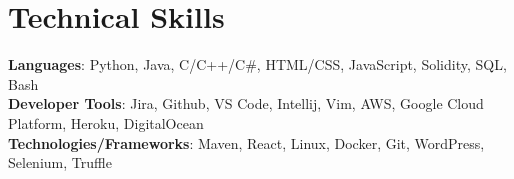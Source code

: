 \documentclass[letterpaper,11pt]{article}
\makeatletter
\newcommand{\resumeItem}[1]{
  \item\small{
    {#1 \vspace{-2pt}}
  }
}
\newcommand{\resumeSubheading}[4]{
  \vspace{-2pt}\item
    \begin{tabular*}{1.0\textwidth}[t]{l@{\extracolsep{\fill}}r}
      \textbf{#1} & \textbf{\small #2} \\
      \textit{\small#3} & \textit{\small #4} \\
    \end{tabular*}\vspace{-7pt}
}
\newcommand{\resumeSubHeadingListStart}{\begin{itemize}[leftmargin=0.0in, label={}]}
\newcommand{\resumeSubHeadingListEnd}{\end{itemize}}
\newcommand{\resumeItemListStart}{\begin{itemize}}
\newcommand{\resumeItemListEnd}{\end{itemize}\vspace{-5pt}}
\makeatother
\begin{document}
%
\section{Technical Skills}
 \begin{itemize}[leftmargin=0.15in, label={}]
    \small{\item{
     \textbf{Languages}{: Python, Java, C/C++/C\#, HTML/CSS, JavaScript, Solidity, SQL, Bash} \\
     \textbf{Developer Tools}{: Jira, Github, VS Code, Intellij, Vim, AWS, Google Cloud Platform, Heroku, DigitalOcean}\\
     \textbf{Technologies/Frameworks}{: Maven, React, Linux, Docker, Git, WordPress, Selenium, Truffle} \\
    }}
 \end{itemize}
 \vspace{-16pt}


\begin{comment}
\section{Leadership / Extracurricular}
    \resumeSubHeadingListStart
        \resumeSubheading{ColorStack}{January 2020 -- May 2022}{President - Chapter Founder}{Carnegie Mellon University}
            \resumeItemListStart
                \resumeItem{Achieved a 4 star fraternity ranking by the Office of Fraternity and Sorority Affairs (highest possible ranking).}
                \resumeItem{Managed executive board of 5 members and ran weekly meetings to oversee progress in essential parts of the chapter.}
                \resumeItem{Led chapter of 30+ members to work towards goals that improve and promote community service, academics, and unity.}
            \resumeItemListEnd

        \resumeSubheading{ColorStack}{January 2020 -- May 2022}{President - Chapter Founder}{Carnegie Mellon University}
            \resumeItemListStart
                \resumeItem{Achieved a 4 star fraternity ranking by the Office of Fraternity and Sorority Affairs (highest possible ranking).}
                \resumeItem{Managed executive board of 5 members and ran weekly meetings to oversee progress in essential parts of the chapter.}
                \resumeItem{Led chapter of 30+ members to work towards goals that improve and promote community service, academics, and unity.}
            \resumeItemListEnd
        
    \resumeSubHeadingListEnd
\end{comment}
\end{document}
